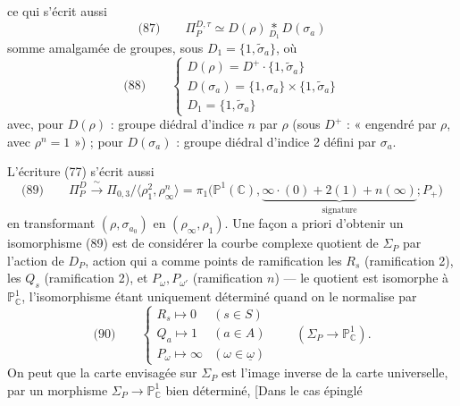 \documentclass[11pt,a4paper]{article}
\begin{document}
ce qui s'écrit aussi
\[
  \text{(87)}\qquad \Pi_P^{D,\tau} \simeq D(\rho) \underset{D_1}{*} D(\sigma_a)
\]
somme amalgamée de groupes, sous $D_1 = \{1, \tilde\sigma_a\}$, où
\[
  \text{(88)}\qquad
  \begin{cases}
    D(\rho) = D^+ \cdot \{1, \tilde\sigma_a\} \\
    D(\sigma_a) = \{1, \sigma_a\} \times \{1, \tilde\sigma_a\} \\
    D_1 = \{1, \tilde\sigma_a\}
  \end{cases}
\]
avec, pour $D(\rho)$ : groupe diédral d'indice $n$   par $\rho$ (sous $D^+$ : « engendré par $\rho$, avec $\rho^n = 1$ ») ; pour $D(\sigma_a)$ : groupe diédral d'indice 2 défini par $\sigma_a$.

L'écriture (77) s'écrit aussi
\[
  \text{(89)}\qquad \Pi_P^D \xrightarrow{\ \sim\ } \Pi_{0,3}/\langle \rho_1^2, \rho_\infty^n \rangle
  = \pi_1\bigl(\mathbb{P}^1(\mathbb{C}), \underbrace{\infty\cdot(0) + 2(1) + n(\infty)}_{\text{signature}} ; P_+\bigr)
\]
en transformant $(\rho, \sigma_{a_0})$ en $(\rho_\infty, \rho_1)$. Une façon a priori d'obtenir un isomorphisme (89) est de considérer la courbe complexe quotient de $\Sigma_P$ par l'action de $D_P$,  action  qui a comme points de ramification les $R_s$ (ramification 2), les $Q_s$ (ramification 2), et $P_\omega, P_{\omega'}$ (ramification $n$) — le quotient est  isomorphe à $\mathbb{P}^1_{\mathbb{C}}$, l'isomorphisme étant uniquement déterminé quand on le normalise par
\[
  \text{(90)}\qquad
  \begin{cases}
    R_s \longmapsto 0 & (s \in S) \\
    Q_a \longmapsto 1 & (a \in A) \\
    P_\omega \longmapsto \infty & (\omega \in \underline{\omega})
  \end{cases}
  \qquad (\Sigma_P \to \mathbb{P}^1_{\mathbb{C}}) .
\]
On peut   que la carte envisagée sur $\Sigma_P$ est l'image inverse de la carte universelle, par un morphisme $\Sigma_P \to \mathbb{P}^1_{\mathbb{C}}$ bien déterminé,  [Dans le cas épinglé
\end{document}
